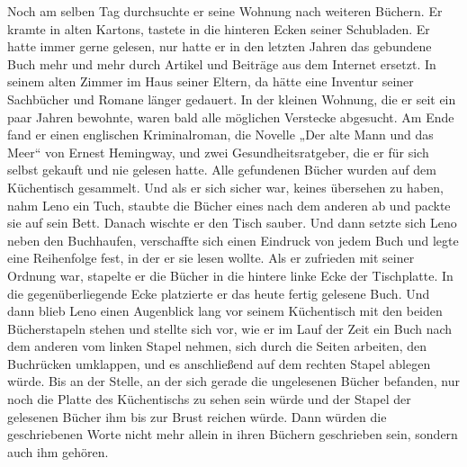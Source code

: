\documentclass[ngerman,smalldemyvopaper,11pt,oneside,onecolumn,openright,extrafontsizes]{memoir}
\begin{document}
Noch am selben Tag durchsuchte er seine Wohnung nach weiteren Büchern. Er kramte in alten Kartons, tastete in die hinteren Ecken seiner Schubladen. Er hatte immer gerne gelesen, nur hatte er in den letzten Jahren das gebundene Buch mehr und mehr durch Artikel und Beiträge aus dem Internet ersetzt. In seinem alten Zimmer im Haus seiner Eltern, da hätte eine Inventur seiner Sachbücher und Romane länger gedauert. In der kleinen Wohnung, die er seit ein paar Jahren bewohnte, waren bald alle möglichen Verstecke abgesucht. Am Ende fand er einen englischen Kriminalroman, die Novelle „Der alte Mann und das Meer“ von Ernest Hemingway, und zwei Gesundheitsratgeber, die er für sich selbst gekauft und nie gelesen hatte. Alle gefundenen Bücher wurden auf dem Küchentisch gesammelt. Und als er sich sicher war, keines übersehen zu haben, nahm Leno ein Tuch, staubte die Bücher eines nach dem anderen ab und packte sie auf sein Bett. Danach wischte er den Tisch sauber. Und dann setzte sich Leno neben den Buchhaufen, verschaffte sich einen Eindruck von jedem Buch und legte eine Reihenfolge fest, in der er sie lesen wollte. Als er zufrieden mit seiner Ordnung war, stapelte er die Bücher in die hintere linke Ecke der Tischplatte. In die gegenüberliegende Ecke platzierte er das heute fertig gelesene Buch. Und dann blieb Leno einen Augenblick lang vor seinem Küchentisch mit den beiden Bücherstapeln stehen und stellte sich vor, wie er im Lauf der Zeit ein Buch nach dem anderen vom linken Stapel nehmen, sich durch die Seiten arbeiten, den Buchrücken umklappen, und es anschließend auf dem rechten Stapel ablegen würde. Bis an der Stelle, an der sich gerade die ungelesenen Bücher befanden, nur noch die Platte des Küchentischs zu sehen sein würde und der Stapel der gelesenen Bücher ihm bis zur Brust reichen würde. Dann würden die geschriebenen Worte nicht mehr allein in ihren Büchern geschrieben sein, sondern auch ihm gehören.\\
\end{document}

